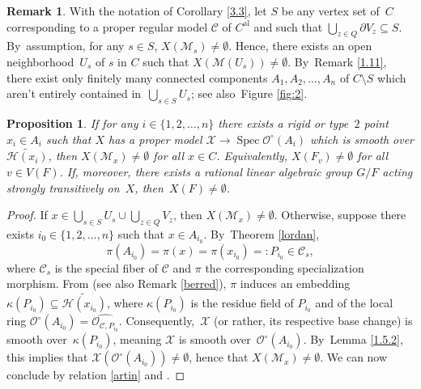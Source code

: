 \documentclass[10pt]{amsart}
\newcommand{\al}{\mathrm{al}}
\DeclareMathOperator{\Spec}{Spec}
\let\backslash\setminus
\newtheorem{prop}[thm]{Proposition}
\theoremstyle{definition}
\newtheorem{rem}[thm]{Remark}
\begin{document}
\begin{rem} \label{3.3.2}
With the notation of Corollary \ref{3.3}, let $S$ be any vertex set of~$C$ corresponding to a proper regular model $\mathscr{C}$ of $C^{\al}$ and such that $\bigcup_{z \in Q} \partial{V_z} \subseteq S$. By~assumption, for any $s \in S$, $X(\mathscr{M}_s) \neq \emptyset$. Hence, there exists an open neighborhood~$U_s$ of $s$ in $C$ such that $X(\mathscr{M}(U_s)) \neq \emptyset$. By~Remark \ref{1.11}, there exist only finitely many connected components $A_1, A_2, \dots, A_n$ of $C \backslash S$ which aren't entirely contained in~${\bigcup_{s \in S} U_s}$; see also~Figure \ref{fig:2}.

\begin{prop} \label{3.3.3}
If for any $i \!\in\! \{1, 2, \dots, n\}$ there exists a rigid or type~$2$ point \hbox{$x_i \!\in\! A_i$} such that $X$ has a proper model $\mathcal{X} \to \Spec \mathcal{O}^{\circ}(A_i)$ which is smooth over $\widetilde{\mathcal{H}(x_i)}$, then $X(\mathscr{M}_x) \neq \emptyset$ for all $x \in C$. Equivalently, $X(F_v) \neq \emptyset$ for all $v \in V(F)$.
If, moreover, there exists a rational linear algebraic group $G/F$ acting strongly transitively on~$X$, then~${X(F) \neq \emptyset}$.
\end{prop}

\begin{proof}
If $x \in \bigcup_{s \in S} U_s \cup \bigcup_{z \in Q} V_z$, then $X(\mathscr{M}_x) \neq \emptyset$. Otherwise, suppose there exists $i_0 \in \{1,2,\dots, n\}$ such that $x \in A_{i_0}$. By~Theorem \ref{lordan},
\[
\pi(A_{i_0})=\pi(x)=\pi(x_{i_0})=:P_{i_0} \in \mathscr{C}_s,
\]
where $\mathscr{C}_s$ is the special fiber of $\mathscr{C}$ and $\pi$ the corresponding specialization morphism.
From \cite[2.4, p.\,35]{Ber90} (see also Remark \ref{berred}), $\pi$ induces an embedding $\kappa(P_{i_0}) \subseteq \widetilde{\mathcal{H}(x_{i_0})}$, where $\kappa(P_{i_0})$ is the residue field of $P_{i_0}$ and of the local ring $\mathcal{O}^{\circ}(A_{i_0})=\widehat{\mathcal{O}_{\mathscr{C}, P_{i_0}}}$. Consequently,~$\mathcal{X}$ (or rather, its respective base change) is smooth over~$\kappa(P_{i_0})$, meaning $\mathcal{X}$ is smooth over~$\mathcal{O}^{\circ}(A_{i_0})$. By~Lemma \ref{1.5.2}, this implies that ${\mathcal{X}(\mathcal{O}^{\circ}(A_{i_0})) \neq \emptyset}$, hence that $X(\mathscr{M}_x) \neq \emptyset$. We can now conclude by relation \eqref{artin} and \cite[Cor.\,3.18]{une}.
\end{proof}
\end{rem}
\end{document}
